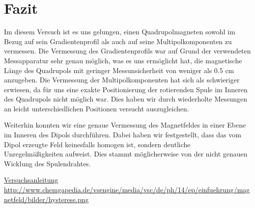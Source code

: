\documentclass[bigchapter,colorback,accentcolor=tud4b,linedtoc,11pt]{tudreport}
\begin{document}
\chapter{Fazit}
Im diesem Versuch ist es uns gelungen, einen Quadrupolmagneten sowohl im Bezug auf sein Gradientenprofil als auch auf seine Multipolkomponenten zu vermessen. Die Vermessung des Gradientenprofils war auf Grund der verwendeten Messapparatur sehr genau möglich, was es uns ermöglicht hat, die magnetische Länge des Quadrupols mit geringer Messunsicherheit von weniger als 0.5 cm anzugeben. Die Vermessung der Multipolkomponenten hat sich als schwieriger erwiesen, da für uns eine exakte Positionierung der rotierenden Spule im Inneren des Quadrupols nicht möglich war. Dies haben wir durch wiederholte Messungen an leicht unterschiedlichen Positionen versucht auszugleichen.

Weiterhin konnten wir eine genaue Vermessung des Magnetfeldes in einer Ebene im Inneren des Dipols durchführen. Dabei haben wir festgestellt, dass das vom Dipol erzeugte Feld keinesfalls homogen ist, sondern deutliche Unregelmäßigkeiten aufweist. Dies stammt möglicherweise von der nicht genauen Wicklung des Spulendrahtes.

\cleardoublepage{}
\newpage
\begin{thebibliography}{100}
   \url{Versuchsanleitung}
   \url{http://www.chemgapedia.de/vsengine/media/vsc/de/ph/14/ep/einfuehrung/magnetfeld/bilder/hysterese.png}
\end{thebibliography}
\end{document}
